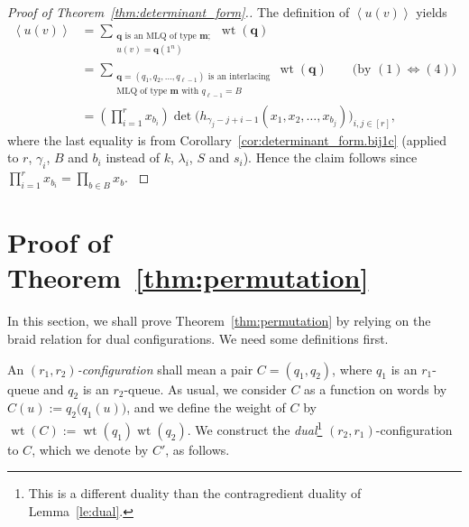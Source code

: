 \documentclass[reqno]{amsart}
\newcommand{\0}{\phantom{c}}
\newcommand{\swt}[1]{\left\langle #1 \right\rangle} %
\DeclareMathOperator{\wt}{wt} %
\newcommand{\mm}{\mathbf{m}}
\newcommand{\qq}{\mathbf{q}}
\let\sumnonlimits\sum
\let\prodnonlimits\prod
\renewcommand{\sum}{\sumnonlimits\limits}
\renewcommand{\prod}{\prodnonlimits\limits}
\newenvironment{verlong}{}{}
\newcommand{\tup}[1]{\left( #1 \right)}
\newcommand{\ive}[1]{\left[ #1 \right]}
\newcommand{\defn}[1]{{\color{darkred}\emph{#1}}} %
\theoremstyle{plain}
\theoremstyle{definition}
\numberwithin{equation}{section}
\begin{document}
\begin{proof}[Proof of Theorem~\ref{thm:determinant_form}.]
The definition of $\swt{u(v)}$ yields
\begin{align*}
\swt{u(v)} & = \sum_{\substack{\qq \text{ is an MLQ of type } \mm; \\ u(v)=\qq(1^n)}}\wt(\qq) \\
&  = \sum_{\substack{\qq = \tup{q_1, q_2, \dotsc, q_{\ell-1}} \text{ is an interlacing} \\\text{MLQ of type } \mm \text{ with } q_{\ell-1}=B}} \wt(\qq) \qquad \text{(by $(1) \Longleftrightarrow (4)$)} \\
&  = \left(  \prod_{i=1}^r x_{b_i} \right) \det\biggl( h_{\gamma_j-j+i-1}\left(x_1,x_2,\ldots,x_{b_j}\right)  \biggr)_{i, j \in \ive{r}} ,
\end{align*}
where the last equality is from Corollary~\ref{cor:determinant_form.bij1c} (applied to $r$, $\gamma_i$, $B$ and $b_i$ instead of $k$, $\lambda_i$, $S$ and $s_i$).
\begin{verlong}
Hence the claim follows since $\prod_{i=1}^r x_{b_i} = \prod_{b \in B} x_b$.
\end{verlong}
\end{proof}












\section{Proof of Theorem~\ref{thm:permutation}}
\label{sec:thm_proof}

In this section, we shall prove Theorem~\ref{thm:permutation} by relying on the
braid relation for dual configurations. We need some definitions first.

An \defn{$(r_1,r_2)$-configuration} shall mean a pair $C = (q_1, q_2)$, where $q_1$ is an $r_1$-queue and $q_2$ is an $r_2$-queue.
As usual, we consider $C$ as a function on words by $C(u) := q_2\bigr(q_1(u)\bigr)$, and we define the weight of $C$ by $\wt(C) := \wt(q_1) \wt(q_2)$.
We construct the \defn{dual}\footnote{This is a different duality than the contragredient duality of Lemma~\ref{le:dual}.} $(r_2,r_1)$-configuration to $C$, which we denote by $C'$, as follows.
\end{document}
